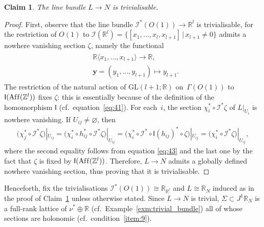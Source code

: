 \documentclass[pdftex]{sigma}
\numberwithin{equation}{section}
\newtheorem{Claim}[Theorem]{Claim}
\newcommand{\RR}{\mathbb{R}}
\newcommand{\ZZ}{\mathbb{Z}}
\begin{document}
\begin{Claim}\label{claim:L_trivial}
 The line bundle $L \to N$ is trivialisable.
\end{Claim}
\begin{proof}
First, observe that the line bundle $\mathcal{I}^*(O(1)) \to \RR^l$ is trivialisable, for the restriction of $O(1)$ to $\mathcal{I}(\RR^l) = \{[x_1,\ldots,x_l,x_{l+1}] \,|\, x_{l+1} \neq 0\}$ admits a nowhere vanishing section $\zeta$, namely the functional
 \begin{gather*}
 \begin{split}
 & \RR\langle x_1,\ldots,x_{l+1}\rangle \to \RR, \\
& \mathbf{y} = (y_1,\ldots,y_{l+1}) \mapsto y_{l+1}.\end{split}
 \end{gather*}
The restriction of the natural action of $\mathrm{GL}(l+1;\RR)$ on~$\Gamma(O(1))$ to $\mathsf{I}(\operatorname{Af\/f}(\ZZ^l))$ f\/ixes $\zeta$: this is essentially because of the def\/inition of the homomorphism $\mathsf{I}$ (cf.\ equation~\eqref{eq:41}). For each~$i$, the section $\chi^*_i \circ \mathcal{I}^*\zeta$ of $L|_{U_i}$ is nowhere vanishing. If $U_{ij} \neq \varnothing$, then
 \begin{gather*}
 \big(\chi^*_j \circ \mathcal{I}^*\zeta\big)|_{U_{ij}} = \big(\chi^*_i \circ h^*_{ij} \circ
 \mathcal{I}^*\zeta\big)|_{U_{ij}} =\big(\chi^*_i \circ \mathcal{I}^* \circ \mathsf{I}(h_{ij})^* \circ
 \zeta\big)|_{U_{ij}} =\big(\chi^*_i \circ \mathcal{I}^*\zeta\big)|_{U_{ij}},
 \end{gather*}
where the second equality follows from equation \eqref{eq:43} and the last one by the fact that $\zeta$ is f\/ixed by $\mathsf{I} (\operatorname{Af\/f}(\ZZ^l) )$. Therefore, $L \to N$ admits a globally def\/ined nowhere vanishing section, thus proving that it is trivialisable.
\end{proof}

Henceforth, f\/ix the trivialisations $\mathcal{I}^*(O(1)) \cong \RR_{\RR^l}$ and $L \cong \RR_{N}$ induced as in the proof of Claim~\ref{claim:L_trivial} unless otherwise stated. Since $L \to N$ is trivial, $\Sigma \subset J^1\RR_N$ is a full-rank lattice of $\nu^* \oplus \RR$ (cf.\ Example~\ref{exm:trivial_bundle}) all of whose sections are holonomic (cf.\ condition~\ref{item:9}).
\end{document}
